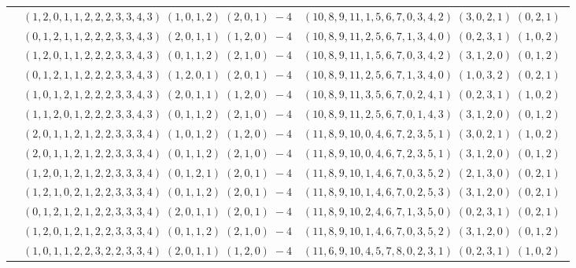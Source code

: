 \documentclass[11pt]{article}
\begin{document}
\begin{longtable}[l]{|c|c|c|}
 \cline{2-3} 
 & $(1 ,2 ,0 ,1 ,1 ,2 ,2 ,2 ,3 ,3 ,4 ,3) \;(1 ,0 ,1 ,2) \;(2 ,0 ,1) \;-4$ & $(10 ,8 ,9 ,11 ,1 ,5 ,6 ,7 ,0 ,3 ,4 ,2) \;(3 ,0 ,2 ,1) \;(0 ,2 ,1) \;$\\ 
 \cline{2-3} 
 & $(0 ,1 ,2 ,1 ,1 ,2 ,2 ,2 ,3 ,3 ,4 ,3) \;(2 ,0 ,1 ,1) \;(1 ,2 ,0) \;-4$ & $(10 ,8 ,9 ,11 ,2 ,5 ,6 ,7 ,1 ,3 ,4 ,0) \;(0 ,2 ,3 ,1) \;(1 ,0 ,2) \;$\\ 
 \cline{2-3} 
 & $(1 ,2 ,0 ,1 ,1 ,2 ,2 ,2 ,3 ,3 ,4 ,3) \;(0 ,1 ,1 ,2) \;(2 ,1 ,0) \;-4$ & $(10 ,8 ,9 ,11 ,1 ,5 ,6 ,7 ,0 ,3 ,4 ,2) \;(3 ,1 ,2 ,0) \;(0 ,1 ,2) \;$\\ 
 \cline{2-3} 
 & $(0 ,1 ,2 ,1 ,1 ,2 ,2 ,2 ,3 ,3 ,4 ,3) \;(1 ,2 ,0 ,1) \;(2 ,0 ,1) \;-4$ & $(10 ,8 ,9 ,11 ,2 ,5 ,6 ,7 ,1 ,3 ,4 ,0) \;(1 ,0 ,3 ,2) \;(0 ,2 ,1) \;$\\ 
 \cline{2-3} 
 & $(1 ,0 ,1 ,2 ,1 ,2 ,2 ,2 ,3 ,3 ,4 ,3) \;(2 ,0 ,1 ,1) \;(1 ,2 ,0) \;-4$ & $(10 ,8 ,9 ,11 ,3 ,5 ,6 ,7 ,0 ,2 ,4 ,1) \;(0 ,2 ,3 ,1) \;(1 ,0 ,2) \;$\\ 
 \cline{2-3} 
 & $(1 ,1 ,2 ,0 ,1 ,2 ,2 ,2 ,3 ,3 ,4 ,3) \;(0 ,1 ,1 ,2) \;(2 ,1 ,0) \;-4$ & $(10 ,8 ,9 ,11 ,2 ,5 ,6 ,7 ,0 ,1 ,4 ,3) \;(3 ,1 ,2 ,0) \;(0 ,1 ,2) \;$\\ 
 \cline{2-3} 
 & $(2 ,0 ,1 ,1 ,2 ,1 ,2 ,2 ,3 ,3 ,3 ,4) \;(1 ,0 ,1 ,2) \;(1 ,2 ,0) \;-4$ & $(11 ,8 ,9 ,10 ,0 ,4 ,6 ,7 ,2 ,3 ,5 ,1) \;(3 ,0 ,2 ,1) \;(1 ,0 ,2) \;$\\ 
 \cline{2-3} 
 & $(2 ,0 ,1 ,1 ,2 ,1 ,2 ,2 ,3 ,3 ,3 ,4) \;(0 ,1 ,1 ,2) \;(2 ,1 ,0) \;-4$ & $(11 ,8 ,9 ,10 ,0 ,4 ,6 ,7 ,2 ,3 ,5 ,1) \;(3 ,1 ,2 ,0) \;(0 ,1 ,2) \;$\\ 
 \cline{2-3} 
 & $(1 ,2 ,0 ,1 ,2 ,1 ,2 ,2 ,3 ,3 ,3 ,4) \;(0 ,1 ,2 ,1) \;(2 ,0 ,1) \;-4$ & $(11 ,8 ,9 ,10 ,1 ,4 ,6 ,7 ,0 ,3 ,5 ,2) \;(2 ,1 ,3 ,0) \;(0 ,2 ,1) \;$\\ 
 \cline{2-3} 
 & $(1 ,2 ,1 ,0 ,2 ,1 ,2 ,2 ,3 ,3 ,3 ,4) \;(0 ,1 ,1 ,2) \;(2 ,0 ,1) \;-4$ & $(11 ,8 ,9 ,10 ,1 ,4 ,6 ,7 ,0 ,2 ,5 ,3) \;(3 ,1 ,2 ,0) \;(0 ,2 ,1) \;$\\ 
 \cline{2-3} 
 & $(0 ,1 ,2 ,1 ,2 ,1 ,2 ,2 ,3 ,3 ,3 ,4) \;(2 ,0 ,1 ,1) \;(2 ,0 ,1) \;-4$ & $(11 ,8 ,9 ,10 ,2 ,4 ,6 ,7 ,1 ,3 ,5 ,0) \;(0 ,2 ,3 ,1) \;(0 ,2 ,1) \;$\\ 
 \cline{2-3} 
 & $(1 ,2 ,0 ,1 ,2 ,1 ,2 ,2 ,3 ,3 ,3 ,4) \;(0 ,1 ,1 ,2) \;(2 ,1 ,0) \;-4$ & $(11 ,8 ,9 ,10 ,1 ,4 ,6 ,7 ,0 ,3 ,5 ,2) \;(3 ,1 ,2 ,0) \;(0 ,1 ,2) \;$\\ 
 \cline{2-3} 
 & $(1 ,0 ,1 ,1 ,2 ,2 ,3 ,2 ,2 ,3 ,3 ,4) \;(2 ,0 ,1 ,1) \;(1 ,2 ,0) \;-4$ & $(11 ,6 ,9 ,10 ,4 ,5 ,7 ,8 ,0 ,2 ,3 ,1) \;(0 ,2 ,3 ,1) \;(1 ,0 ,2) \;$\\ 

\end{longtable}
\end{document}
